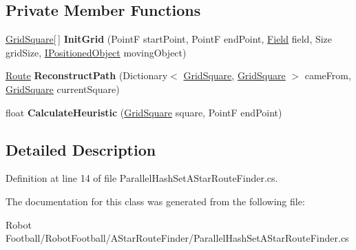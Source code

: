 \subsection*{Private Member Functions}
\begin{DoxyCompactItemize}
\item 
\hypertarget{class_route_finders_1_1_parallel_hash_set_a_star_route_finder_ada7dd090b50c1c817fe08c27851ca30a}{\hyperlink{class_route_finders_1_1_grid_square}{Grid\-Square}\mbox{[}$\,$\mbox{]} {\bfseries Init\-Grid} (Point\-F start\-Point, Point\-F end\-Point, \hyperlink{class_robot_football_core_1_1_objects_1_1_field}{Field} field, Size grid\-Size, \hyperlink{interface_robot_football_core_1_1_interfaces_1_1_i_positioned_object}{I\-Positioned\-Object} moving\-Object)}\label{class_route_finders_1_1_parallel_hash_set_a_star_route_finder_ada7dd090b50c1c817fe08c27851ca30a}

\item 
\hypertarget{class_route_finders_1_1_parallel_hash_set_a_star_route_finder_a71115071fa6423d000fa4dd282540ecf}{\hyperlink{class_robot_football_core_1_1_route_objects_1_1_route}{Route} {\bfseries Reconstruct\-Path} (Dictionary$<$ \hyperlink{class_route_finders_1_1_grid_square}{Grid\-Square}, \hyperlink{class_route_finders_1_1_grid_square}{Grid\-Square} $>$ came\-From, \hyperlink{class_route_finders_1_1_grid_square}{Grid\-Square} current\-Square)}\label{class_route_finders_1_1_parallel_hash_set_a_star_route_finder_a71115071fa6423d000fa4dd282540ecf}

\item 
\hypertarget{class_route_finders_1_1_parallel_hash_set_a_star_route_finder_a2bfe054e840c1697792a67b0b6eb8be6}{float {\bfseries Calculate\-Heuristic} (\hyperlink{class_route_finders_1_1_grid_square}{Grid\-Square} square, Point\-F end\-Point)}\label{class_route_finders_1_1_parallel_hash_set_a_star_route_finder_a2bfe054e840c1697792a67b0b6eb8be6}

\end{DoxyCompactItemize}


\subsection{Detailed Description}


Definition at line 14 of file Parallel\-Hash\-Set\-A\-Star\-Route\-Finder.\-cs.



The documentation for this class was generated from the following file\-:\begin{DoxyCompactItemize}
\item 
Robot Football/\-Robot\-Football/\-A\-Star\-Route\-Finder/Parallel\-Hash\-Set\-A\-Star\-Route\-Finder.\-cs\end{DoxyCompactItemize}
